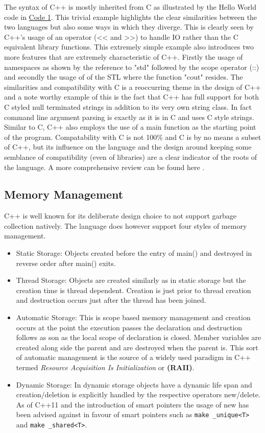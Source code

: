 \documentclass[conference, a4paper]{IEEEtran}
\begin{document}
The syntax of C++ is mostly inherited from C as illustrated by the Hello World code in \hyperref[listing:1]{Code 1}. This trivial example highlights the clear similarities between the two languages but also some ways in which they diverge. This is clearly seen by C++'s usage of an operator (<< and >>) to handle IO rather than the C equivalent library functions. This extremely simple example also introduces two more features that are extremely characteristic of C++. Firstly the usage of namespaces as shown by the reference to "std" followed by the scope operator (::) and secondly the usage of of the STL where the function "cout" resides. The similarities and compatibility with C is a reoccurring theme in the design of C++ and a note worthy example of this is the fact that C++ has full support for both C styled null terminated strings in addition to its very own string class. In fact command line argument parsing is exactly as it is in C and uses C style strings. Similar to C, C++ also employs the use of a main function as the starting point of the program. Compatability with C is not 100\% and C is by no means a subset of C++, but its influence on the language and the design around keeping some semblance of compatibility (even of libraries) are a clear indicator of the roots of the language. A more comprehensive review can be found here \cite{calder1994quantifying}.

\subsection{Memory Management}

C++ is well known for its deliberate design choice to not support garbage collection natively. The language does however support four styles of memory management. 

\begin{itemize}
    \item Static Storage: Objects created before the entry of main() and destroyed in reverse order after main() exits.
    \item Thread Storage:  Objects are created similarly as in static storage but the creation time is thread dependent. Creation is just prior to thread creation and destruction occurs just after the thread has been joined. 
    \item Automatic Storage: This is scope based memory management and creation occurs at the point the execution passes the declaration and destruction follows as son as the local scope of declaration is closed. Member variables are created along side the parent and are destroyed when the parent is. This sort of automatic management is the source of a widely used paradigm in C++ termed \textit{Resource Acquisition Is Initialization} or \textbf{(RAII)}.
    \item Dynamic Storage: In dynamic storage objects have a dynamic life span and creation/deletion is explicitly handled by the respective operators new/delete. As of C++11 and the introduction of smart pointers the usage of new has been advised against in favour of smart pointers such as \texttt{make _unique<T>} and \texttt{make _shared<T>}.

\end{itemize}
\end{document}
